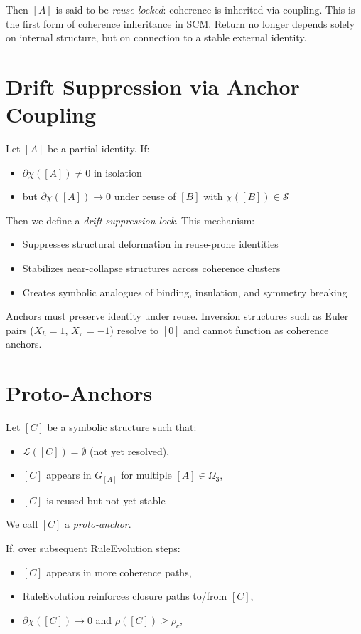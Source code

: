 Then $[A]$ is said to be \emph{reuse-locked}: coherence is inherited via coupling.  
This is the first form of coherence inheritance in SCM.  
Return no longer depends solely on internal structure, but on connection to a stable external identity.

\section{Drift Suppression via Anchor Coupling} \label{drift-suppression-via-anchor-coupling}

Let $[A]$ be a partial identity. If:
\begin{itemize}
  \item $\partial \chi([A]) \ne 0$ in isolation
  \item but $\partial \chi([A]) \rightarrow 0$ under reuse of $[B]$ with $\chi([B]) \in \mathcal{S}$
\end{itemize}

Then we define a \textit{drift suppression lock}.  
This mechanism:
\begin{itemize}
  \item Suppresses structural deformation in reuse-prone identities
  \item Stabilizes near-collapse structures across coherence clusters
  \item Creates symbolic analogues of binding, insulation, and symmetry breaking
\end{itemize}

Anchors must preserve identity under reuse.  
Inversion structures such as Euler pairs ($X_h = 1$, $X_\pi = -1$) resolve to $[0]$ and cannot function as coherence anchors.

\section{Proto-Anchors} \label{proto-anchors}

Let $[C]$ be a symbolic structure such that:
\begin{itemize}
  \item $\mathcal{L}([C]) = \emptyset$ (not yet resolved),
  \item $[C]$ appears in $G_{[A]}$ for multiple $[A] \in \Omega_3$,
  \item $[C]$ is reused but not yet stable
\end{itemize}

We call $[C]$ a \emph{proto-anchor}.

If, over subsequent RuleEvolution steps:
\begin{itemize}
  \item $[C]$ appears in more coherence paths,
  \item RuleEvolution reinforces closure paths to/from $[C]$,
  \item $\partial \chi([C]) \rightarrow 0$ and $\rho([C]) \geq \rho_c$,
\end{itemize}

